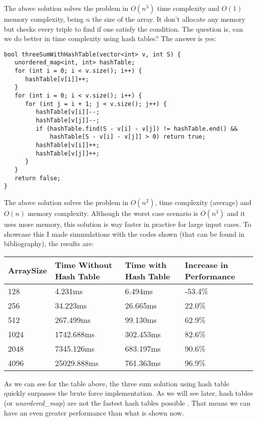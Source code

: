 \medskip

The above solution solves the problem in \( O(n^3) \) time complexity and \( O(1) \) memory complexity, being \( n \) the size of the array. It don't allocate any memory but checks every triple to find if one satisfy the condition. The question is, can we do better in time complexity using hash tables? The answer is yes:

\medskip

\begin{lstlisting}
bool threeSumWithHashTable(vector<int> v, int S) {
   unordered_map<int, int> hashTable; 
   for (int i = 0; i < v.size(); i++) {
      hashTable[v[i]]++;
   }
   for (int i = 0; i < v.size(); i++) {
      for (int j = i + 1; j < v.size(); j++) {
         hashTable[v[i]]--;
         hashTable[v[j]]--;         
         if (hashTable.find(S - v[i] - v[j]) != hashTable.end() &&
             hashTable[S - v[i] - v[j]] > 0) return true;
         hashTable[v[i]]++;
         hashTable[v[j]]++;
      }
   }
   return false;
}
\end{lstlisting}

\medskip

The above solution solves the problem in \( O(n^2) \), time complexity (average) and \( O(n) \) memory complexity. Although the worst case scenario is \( O(n^3) \) and it uses more memory, this solution is way faster in practice for large input cases. To showcase this I made simmulations with the codes shown (that can be found in bibliography), the results are: \\

\bigskip

\begin{tabular}{|l|l|l|l|}
  \hline
  ArraySize & Time Without Hash Table & Time with Hash Table & Increase in Performance \\
  \hline
  128       & 4.231ms                 & 6.494ms              & -53.4\%                  \\
  \hline
  256       & 34.223ms                & 26.665ms             & 22.0\%                   \\
  \hline
  512       & 267.499ms               & 99.130ms             & 62.9\%                   \\
  \hline
  1024      & 1742.688ms              & 302.453ms            & 82.6\%                   \\
  \hline
  2048      & 7345.126ms              & 683.197ms            & 90.6\%                   \\
  \hline
  4096      & 25029.888ms             & 761.363ms            & 96.9\%                   \\
  \hline
\end{tabular}

\bigskip

As we can see for the table above, the three sum solution using hash table quickly surpasses the brute force implementation. As we will see later, hash tables (or \textit{unordered\_map}) are not the fastest hash tables possible \cite{UnorderedMapDiscussion}. That means we can have an even greater performance than what is shown now.  